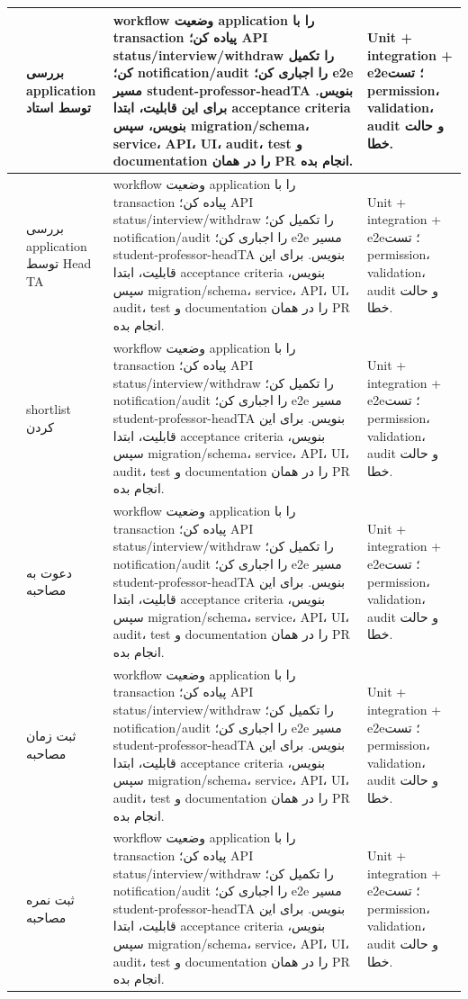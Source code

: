 \documentclass[11pt,a4paper]{article}
\begin{document}
\begin{longtable}{|>{\raggedleft\arraybackslash}p{}|>{\raggedleft\arraybackslash}p{}|>{\raggedleft\arraybackslash}p{}|>{\raggedleft\arraybackslash}p{}|}
62 & بررسی application توسط استاد & workflow وضعیت application را با transaction پیاده کن؛ API status/interview/withdraw را تکمیل کن؛ notification/audit را اجباری کن؛ e2e مسیر student-professor-headTA بنویس. برای این قابلیت، ابتدا acceptance criteria بنویس، سپس migration/schema، service، API، UI، audit، test و documentation را در همان PR انجام بده. & Unit + integration + e2e؛ تست permission، validation، audit و حالت خطا. \\ \hline
63 & بررسی application توسط Head TA & workflow وضعیت application را با transaction پیاده کن؛ API status/interview/withdraw را تکمیل کن؛ notification/audit را اجباری کن؛ e2e مسیر student-professor-headTA بنویس. برای این قابلیت، ابتدا acceptance criteria بنویس، سپس migration/schema، service، API، UI، audit، test و documentation را در همان PR انجام بده. & Unit + integration + e2e؛ تست permission، validation، audit و حالت خطا. \\ \hline
64 & shortlist کردن & workflow وضعیت application را با transaction پیاده کن؛ API status/interview/withdraw را تکمیل کن؛ notification/audit را اجباری کن؛ e2e مسیر student-professor-headTA بنویس. برای این قابلیت، ابتدا acceptance criteria بنویس، سپس migration/schema، service، API، UI، audit، test و documentation را در همان PR انجام بده. & Unit + integration + e2e؛ تست permission، validation، audit و حالت خطا. \\ \hline
65 & دعوت به مصاحبه & workflow وضعیت application را با transaction پیاده کن؛ API status/interview/withdraw را تکمیل کن؛ notification/audit را اجباری کن؛ e2e مسیر student-professor-headTA بنویس. برای این قابلیت، ابتدا acceptance criteria بنویس، سپس migration/schema، service، API، UI، audit، test و documentation را در همان PR انجام بده. & Unit + integration + e2e؛ تست permission، validation، audit و حالت خطا. \\ \hline
66 & ثبت زمان مصاحبه & workflow وضعیت application را با transaction پیاده کن؛ API status/interview/withdraw را تکمیل کن؛ notification/audit را اجباری کن؛ e2e مسیر student-professor-headTA بنویس. برای این قابلیت، ابتدا acceptance criteria بنویس، سپس migration/schema، service، API، UI، audit، test و documentation را در همان PR انجام بده. & Unit + integration + e2e؛ تست permission، validation، audit و حالت خطا. \\ \hline
67 & ثبت نمره مصاحبه & workflow وضعیت application را با transaction پیاده کن؛ API status/interview/withdraw را تکمیل کن؛ notification/audit را اجباری کن؛ e2e مسیر student-professor-headTA بنویس. برای این قابلیت، ابتدا acceptance criteria بنویس، سپس migration/schema، service، API، UI، audit، test و documentation را در همان PR انجام بده. & Unit + integration + e2e؛ تست permission، validation، audit و حالت خطا. \\ \hline

\end{longtable}
\end{document}
